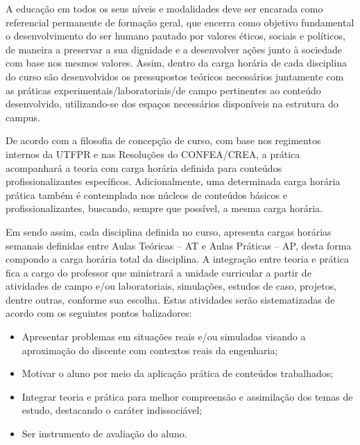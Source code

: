 A educação em todos os seus níveis e modalidades deve ser encarada como referencial permanente de formação geral, que encerra como objetivo fundamental o desenvolvimento do ser humano pautado por valores éticos, sociais e políticos, de maneira a preservar a sua dignidade e a desenvolver ações junto à sociedade com base nos mesmos valores. Assim, dentro da carga horária de cada disciplina do curso são desenvolvidos os pressupostos teóricos necessários juntamente com as práticas experimentais/laboratoriais/de campo pertinentes ao conteúdo desenvolvido, utilizando-se dos espaços necessários disponíveis na estrutura do campus.


De acordo com a filosofia de concepção de curso, com base nos regimentos internos da UTFPR e nas Resoluções do CONFEA/CREA, a prática acompanhará a teoria com carga horária definida para conteúdos profissionalizantes específicos. Adicionalmente, uma determinada carga horária prática também é contemplada nos núcleos de conteúdos básicos e profissionalizantes, buscando, sempre que possível, a mesma carga horária.

Em sendo assim, cada disciplina definida no curso, apresenta cargas horárias semanais definidas entre Aulas Teóricas – AT e Aulas Práticas – AP, desta forma compondo a carga horária total da disciplina. A integração entre teoria e prática fica a cargo do professor que ministrará a unidade curricular a partir de atividades de campo e/ou laboratoriais, simulações, estudos de caso, projetos, dentre outras, conforme sua escolha. Estas atividades serão sistematizadas de acordo com os seguintes pontos balizadores:

\begin{itemize}
    \item Apresentar problemas em situações reais e/ou simuladas visando a aproximação do discente com contextos reais da engenharia;
    \item Motivar o aluno por meio da aplicação prática de conteúdos trabalhados;
    \item Integrar teoria e prática para melhor compreensão e assimilação dos temas de estudo, destacando o caráter indissociável;
    \item Ser instrumento de avaliação do aluno.
\end{itemize}

